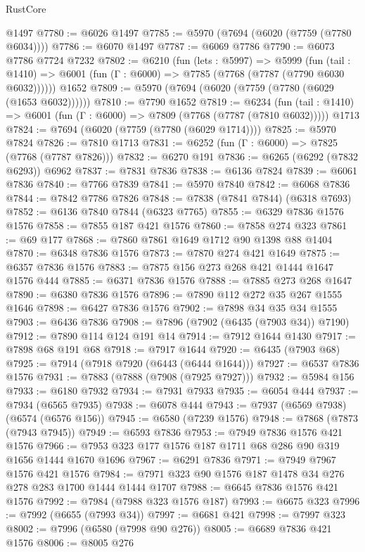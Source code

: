 \begin{lexlean}{RustCore}
\begin{coremodule}
    @1497
@7780 := @6026 @1497
@7785 := @5970 (@7694 (@6020 (@7759 (@7780 @6034))))
@7786 := @6070 @1497
@7787 := @6069 @7786
@7790 := @6073 @7786 @7724 @7232
@7802 := @6210
    (fun (lets : @5997) =>
    @5999
      (fun (tail : @1410) => @6001 (fun (Γ : @6000) => @7785 (@7768 (@7787 (@7790 @6030 @6032))))))
    @1652
@7809 := @5970 (@7694 (@6020 (@7759 (@7780 (@6029 (@1653 @6032))))))
@7810 := @7790 @1652
@7819 := @6234
    (fun (tail : @1410) => @6001 (fun (Γ : @6000) => @7809 (@7768 (@7787 (@7810 @6032)))))
    @1713
@7824 := @7694 (@6020 (@7759 (@7780 (@6029 @1714))))
@7825 := @5970 @7824
@7826 := @7810 @1713
@7831 := @6252 (fun (Γ : @6000) => @7825 (@7768 (@7787 @7826)))
@7832 := @6270 @191
@7836 := @6265 (@6292 (@7832 @6293)) @6962
@7837 := @7831 @7836
@7838 := @6136 @7824
@7839 := @6061 @7836
@7840 := @7766 @7839
@7841 := @5970 @7840
@7842 := @6068 @7836
@7844 := @7842 @7786 @7826
@7848 := @7838 (@7841 @7844) (@6318 @7693)
@7852 := @6136 @7840 @7844 (@6323 @7765)
@7855 := @6329 @7836 @1576 @1576
@7858 := @7855 @187 @421 @1576
@7860 := @7858 @274 @323
@7861 := @69 @177
@7868 := @7860 @7861 @1649 @1712 @90 @1398 @88 @1404
@7870 := @6348 @7836 @1576
@7873 := @7870 @274 @421 @1649
@7875 := @6357 @7836 @1576
@7883 := @7875 @156 @273 @268 @421 @1444 @1647 @1576 @444
@7885 := @6371 @7836 @1576
@7888 := @7885 @273 @268 @1647
@7890 := @6380 @7836 @1576
@7896 := @7890 @112 @272 @35 @267 @1555 @1646
@7898 := @6427 @7836 @1576
@7902 := @7898 @34 @35 @34 @1555
@7903 := @6436 @7836
@7908 := @7896 (@7902 (@6435 (@7903 @34)) @7190)
@7912 := @7890 @114 @124 @191 @14
@7914 := @7912 @1644 @1430
@7917 := @7898 @68 @191 @68
@7918 := @7917 @1644
@7920 := @6435 (@7903 @68)
@7925 := @7914 (@7918 @7920 (@6443 (@6444 @1644)))
@7927 := @6537 @7836 @1576
@7931 := @7883 (@7888 (@7908 (@7925 @7927)))
@7932 := @5984 @156
@7933 := @6180 @7932
@7934 := @7931 @7933
@7935 := @6054 @444
@7937 := @7934 (@6565 @7935)
@7938 := @6078 @444
@7943 := @7937 (@6569 @7938) (@6574 (@6576 @156))
@7945 := @6580 (@7239 @1576)
@7948 := @7868 (@7873 (@7943 @7945))
@7949 := @6593 @7836
@7953 := @7949 @7836 @1576 @421 @1576
@7966 := @7953 @323 @177 @1576 @187 @1711 @68 @286 @90 @319 @1656 @1444 @1670 @1696
@7967 := @6291 @7836
@7971 := @7949 @7967 @1576 @421 @1576
@7984 := @7971 @323 @90 @1576 @187 @1478 @34 @276 @278 @283 @1700 @1444 @1444 @1707
@7988 := @6645 @7836 @1576 @421 @1576
@7992 := @7984 (@7988 @323 @1576 @187)
@7993 := @6675 @323
@7996 := @7992 (@6655 (@7993 @34))
@7997 := @6681 @421
@7998 := @7997 @323
@8002 := @7996 (@6580 (@7998 @90 @276))
@8005 := @6689 @7836 @421 @1576
@8006 := @8005 @276

\end{coremodule}
\end{lexlean}
